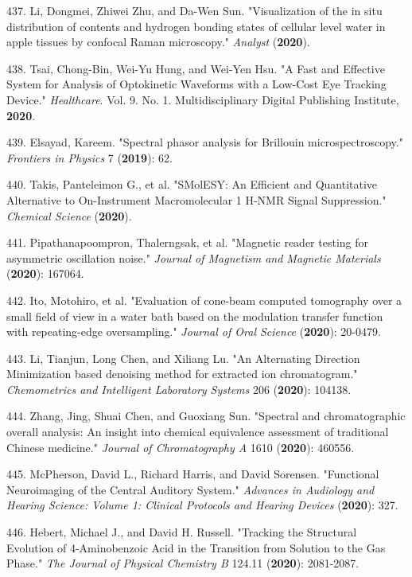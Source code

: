 437. Li, Dongmei, Zhiwei Zhu, and Da-Wen Sun. "Visualization of the in situ distribution of contents and hydrogen bonding states of cellular level water in apple tissues by confocal Raman microscopy." \textit{Analyst} (\textbf{2020}).

438. Tsai, Chong-Bin, Wei-Yu Hung, and Wei-Yen Hsu. "A Fast and Effective System for Analysis of Optokinetic Waveforms with a Low-Cost Eye Tracking Device." \textit{Healthcare}. Vol. 9. No. 1. Multidisciplinary Digital Publishing Institute, \textbf{2020}.

439. Elsayad, Kareem. "Spectral phasor analysis for Brillouin microspectroscopy." \textit{Frontiers in Physics} 7 (\textbf{2019}): 62.

440. Takis, Panteleimon G., et al. "SMolESY: An Efficient and Quantitative Alternative to On-Instrument Macromolecular 1 H-NMR Signal Suppression." \textit{Chemical Science} (\textbf{2020}).

441. Pipathanapoompron, Thalerngsak, et al. "Magnetic reader testing for asymmetric oscillation noise." \textit{Journal of Magnetism and Magnetic Materials} (\textbf{2020}): 167064.

442. Ito, Motohiro, et al. "Evaluation of cone-beam computed tomography over a small field of view in a water bath based on the modulation transfer function with repeating-edge oversampling." \textit{Journal of Oral Science} (\textbf{2020}): 20-0479.

443. Li, Tianjun, Long Chen, and Xiliang Lu. "An Alternating Direction Minimization based denoising method for extracted ion chromatogram." \textit{Chemometrics and Intelligent Laboratory Systems} 206 (\textbf{2020}): 104138.

444. Zhang, Jing, Shuai Chen, and Guoxiang Sun. "Spectral and chromatographic overall analysis: An insight into chemical equivalence assessment of traditional Chinese medicine." \textit{Journal of Chromatography A} 1610 (\textbf{2020}): 460556.

445. McPherson, David L., Richard Harris, and David Sorensen. "Functional Neuroimaging of the Central Auditory System." \textit{Advances in Audiology and Hearing Science: Volume 1: Clinical Protocols and Hearing Devices} (\textbf{2020}): 327.

446. Hebert, Michael J., and David H. Russell. "Tracking the Structural Evolution of 4-Aminobenzoic Acid in the Transition from Solution to the Gas Phase." \textit{The Journal of Physical Chemistry B} 124.11 (\textbf{2020}): 2081-2087.

